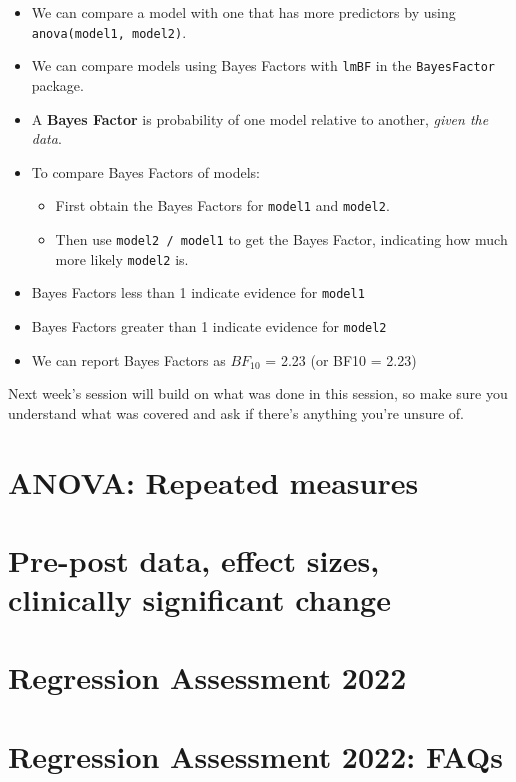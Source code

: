 \documentclass[
]{book}
\theoremstyle{definition}
\theoremstyle{definition}
\theoremstyle{definition}
\theoremstyle{definition}
\theoremstyle{remark}
\begin{document}
\begin{itemize}
\item
  We can compare a model with one that has more predictors by using \texttt{anova(model1,\ model2)}.
\item
  We can compare models using Bayes Factors with \texttt{lmBF} in the \texttt{BayesFactor} package.
\item
  A \textbf{Bayes Factor} is probability of one model relative to another, \emph{given the data}.
\item
  To compare Bayes Factors of models:

  \begin{itemize}
  \item
    First obtain the Bayes Factors for \texttt{model1} and \texttt{model2}.
  \item
    Then use \texttt{model2\ /\ model1} to get the Bayes Factor, indicating how much more likely \texttt{model2} is.
  \end{itemize}
\item
  Bayes Factors less than 1 indicate evidence for \texttt{model1}
\item
  Bayes Factors greater than 1 indicate evidence for \texttt{model2}
\item
  We can report Bayes Factors as \(BF_{10}\) = 2.23 (or BF10 = 2.23)
\end{itemize}

\hfill\break

Next week's session will build on what was done in this session, so make sure you understand what was covered and ask if there's anything you're unsure of.

\hypertarget{anova-repeated-measures}{%
\chapter{ANOVA: Repeated measures}\label{anova-repeated-measures}}

\hypertarget{pre-post-data-effect-sizes-clinically-significant-change}{%
\chapter{Pre-post data, effect sizes, clinically significant change}\label{pre-post-data-effect-sizes-clinically-significant-change}}

\hypertarget{regression-assessment-2022}{%
\chapter{Regression Assessment 2022}\label{regression-assessment-2022}}

\hypertarget{regression-assessment-2022-faqs}{%
\chapter{Regression Assessment 2022: FAQs}\label{regression-assessment-2022-faqs}}

\hypertarget{appendix-appendices}{%
\appendix}


  
\end{document}
